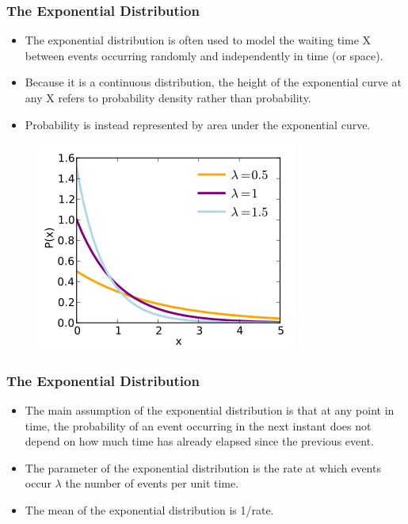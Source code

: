 \documentclass[MAIN.tex]{subfiles}
\begin{document}
 
	\begin{frame}[fragile]
		\frametitle{The Exponential Distribution}
\large
\begin{itemize}
\item The exponential distribution is often used to model the waiting time X between events occurring randomly and independently in time (or space).\item  Because it is a continuous distribution, the height of the exponential curve at any X refers to probability density rather than probability.
\item  Probability is instead represented by area under the exponential curve.
\end{itemize}

\end{frame}
\begin{frame}
	\begin{figure}
\centering
\includegraphics[width=0.7\linewidth]{images/exponential}
\end{figure}
\end{frame}
\begin{frame}[fragile]
	\frametitle{The Exponential Distribution}
		\large
\begin{itemize}
\item The main assumption of the exponential distribution is that at any point in time, the probability of an event occurring in the next instant does not depend on how much time has already elapsed since the previous event. 
\item The parameter of the exponential distribution is the rate at which events occur $\lambda$ the number of events per unit time. \item The mean of the exponential distribution is 1/rate.
\end{itemize}

\end{frame}
\end{document}
